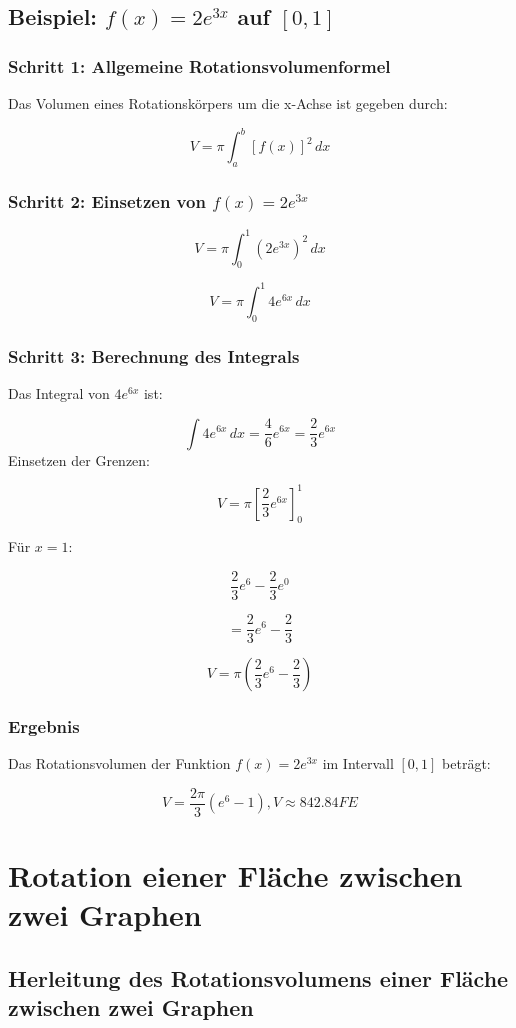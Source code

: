 \documentclass[a4paper,final]{report}
\begin{document}
\section{Beispiel: \( f(x) = 2e^{3x} \) auf \( [0,1] \)}

\subsection{Schritt 1: Allgemeine Rotationsvolumenformel}
Das Volumen eines Rotationskörpers um die x-Achse ist gegeben durch:

\[
V = \pi \int_a^b [f(x)]^2 \, dx
\]

\subsection{Schritt 2: Einsetzen von \( f(x) = 2e^{3x} \)}
\[
V = \pi \int_0^1 (2e^{3x})^2 \, dx
\]

\[
V = \pi \int_0^1 4e^{6x} \, dx
\]

\subsection{Schritt 3: Berechnung des Integrals}
Das Integral von \( 4e^{6x} \) ist:

\[
\int 4e^{6x} \, dx = \frac{4}{6} e^{6x} = \frac{2}{3} e^{6x}
\]
Einsetzen der Grenzen:

\[
V = \pi \left[ \frac{2}{3} e^{6x} \right]_0^1
\]

Für \( x = 1 \):

\[
\frac{2}{3} e^{6} - \frac{2}{3} e^{0}
\]

\[
= \frac{2}{3} e^{6} - \frac{2}{3}
\]

\[
V = \pi \left( \frac{2}{3} e^{6} - \frac{2}{3} \right)
\]

\subsection{Ergebnis}
Das Rotationsvolumen der Funktion \( f(x) = 2e^{3x} \) im Intervall \( [0,1] \) beträgt:

\[
V = \frac{2\pi}{3} (e^6 - 1), V \approx 842.84FE
\]

\chapter{Rotation eiener Fläche zwischen zwei Graphen}

\section{Herleitung des Rotationsvolumens einer Fläche zwischen zwei Graphen}
\end{document}
